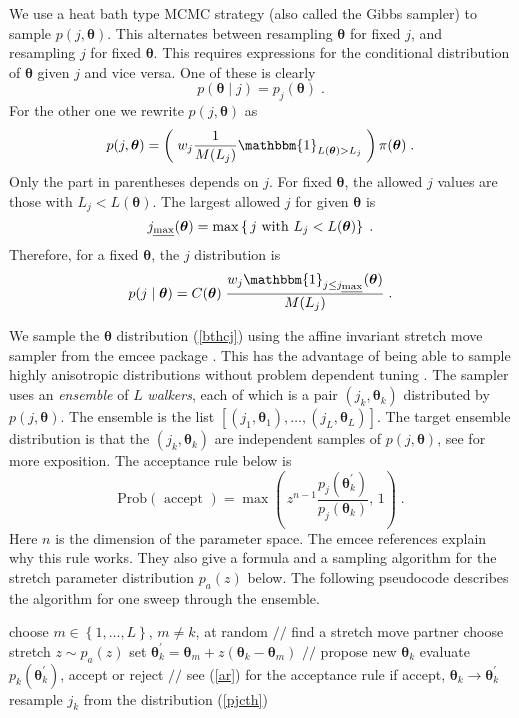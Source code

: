 \documentclass[letterpaper, preprint]{aastex}
\newcommand{\bth} {\boldsymbol \theta}
\begin{document}
We use a heat bath type MCMC strategy (also called the Gibbs sampler) to sample $p(j,\bth)$.
This alternates between resampling $\bth$ for fixed $j$, and resampling $j$ for fixed $\bth$.
This requires expressions for the conditional distribution of $\bth$ given $j$ and vice versa.
One of these is clearly
\begin{equation}
p(\bth \mid j) = p_j(\bth) \; .
\label{bthcj} \end{equation}
For the other one we rewrite $p(j,\bth)$ as
$$
p(j,\bth) = \left(\;w_j \frac{1}{M(L_j)} \mathbbm{1}_{L(\bth)>L_j} \;\right)\pi(\bth) \; .
$$
Only the part in parentheses depends on $j$.
For fixed $\bth$, the allowed $j$ values are those with $L_j < L(\bth)$.
The largest allowed $j$ for given $\bth$ is 
$$
j_{\mbox{\scriptsize \em max}}(\bth) = \max\left\{ \,j \mbox{ with } L_j < L(\bth) \right\} \; .
$$
Therefore, for a fixed $\bth$, the $j$ distribution is
\begin{equation}
p(j\mid \bth) 
= C(\bth)\;\frac{w_j \mathbbm{1}_{j \leq j_{\mbox{\scriptsize \em max}}}(\bth) }{M(L_j)} \; .
\label{pjcth}  \end{equation}

We sample the $\bth$ distribution (\ref{bthcj}) using the affine invariant stretch move sampler
from the emcee package \cite{D}.
This has the advantage of being able to sample highly anisotropic distributions without problem 
dependent tuning \cite{H}.
The sampler uses an {\em ensemble} of $L$ {\em walkers}, each of which is a pair $(j_k,\bth_k)$
distributed by $p(j,\bth)$.
The ensemble is the list $[(j_1,\bth_1), \ldots, (j_L,\bth_L)]$.
The target ensemble distribution is that the $(j_k,\bth_k)$ are independent samples of $p(j,\bth)$,
see \cite{GW} for more exposition.
The acceptance rule below is
\begin{equation}
\mbox{Prob}(\mbox{ accept }) 
= \max\left( \, z^{n-1} \frac{p_j(\bth_k^{\prime})}{p_j(\bth_k)},\, 1\right) \; .
\label{ar}  \end{equation}
Here $n$ is the dimension of the parameter space.
The emcee references explain why this rule works.
They also give a formula and a sampling algorithm for the stretch parameter distribution $p_a(z)$ below.
The following pseudocode describes the algorithm for one sweep through the ensemble.
\begin{algorithmic}
   \State choose $m \in \left\{1,\ldots,L\right\}$, $m \neq k$, at random      
             \hspace{.4in} $\mbox{//}$ find a stretch move partner
   \State choose stretch $z \sim p_a(z)$
   \State set $\bth^{\prime}_k = \bth_m + z(\bth_k - \bth_m)$
              \hspace{1.45in} $\mbox{//}$ propose new $\bth_k$
   \State evaluate $p_{k}(\bth^{\prime}_k)$, accept or reject
              \hspace{1in} $\mbox{//}$ see (\ref{ar}) for the acceptance rule
   \State if accept, $\bth_k \rightarrow \bth_k^{\prime}$
   \State resample $j_k$ from the distribution (\ref{pjcth})
\EndFor
\end{algorithmic}
\end{document}
